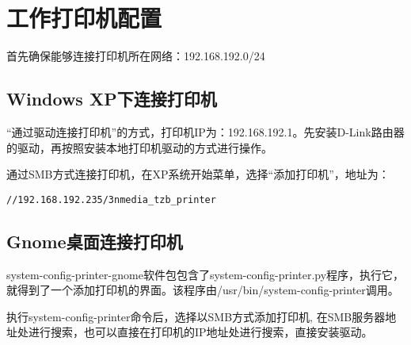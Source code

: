 

\section{工作打印机配置}
首先确保能够连接打印机所在网络：192.168.192.0/24

\subsection{Windows XP下连接打印机}

“通过驱动连接打印机”的方式，打印机IP为：192.168.192.1。先安装D-Link路由器的驱动，再按照安装本地打印机驱动的方式进行操作。

通过SMB方式连接打印机，在XP系统开始菜单，选择“添加打印机”，地址为：
\begin{verbatim}
//192.168.192.235/3nmedia_tzb_printer
\end{verbatim}

\subsection{Gnome桌面连接打印机}
system-config-printer-gnome软件包包含了system-config-printer.py程序，执行它，就得到了一个添加打印机的界面。该程序由/usr/bin/system-config-printer调用。

执行system-config-printer命令后，选择以SMB方式添加打印机, 在SMB服务器地址处进行搜索，也可以直接在打印机的IP地址处进行搜索，直接安装驱动。



